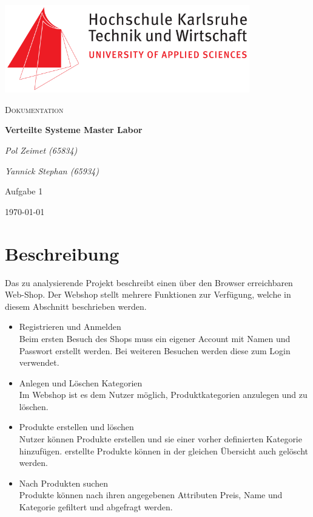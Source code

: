 \documentclass[12pt,a4paper]{article}
\begin{document}
	\begin{titlepage}
		\centering
		\includegraphics[width=0.8\textwidth]{img/Hska_logo.png}\par\vspace{1cm}
		{\scshape\LARGE Dokumentation\par}
		\vspace{1.5cm}
		{\huge\bfseries Verteilte Systeme Master Labor\par}
		\vspace{2cm}
		{\Large\itshape Pol Zeimet (65834)\par}
		{\Large\itshape Yannick Stephan (65934)\par}
		\vfill
		\large Aufgabe 1
		
		\vfill
		
		{\large \today\par}
	\end{titlepage}
	\section{Beschreibung}
	Das zu analysierende Projekt beschreibt einen über den Browser erreichbaren Web-Shop. Der Webshop stellt mehrere Funktionen zur Verfügung, welche in diesem Abschnitt beschrieben werden.
	\begin{itemize}
	\item{Registrieren und Anmelden}\\ Beim ersten Besuch des Shops muss ein eigener Account mit Namen und Passwort erstellt werden. Bei weiteren Besuchen werden diese zum Login verwendet.
	\item{Anlegen und Löschen Kategorien}\\ Im Webshop ist es dem Nutzer möglich, Produktkategorien anzulegen und zu löschen.
	\item{Produkte erstellen und löschen}\\ Nutzer können Produkte erstellen und sie einer vorher definierten Kategorie hinzufügen. erstellte Produkte können in der gleichen Übersicht auch gelöscht werden.
	\item{Nach Produkten suchen}\\ Produkte können nach ihren angegebenen Attributen  Preis, Name und Kategorie gefiltert und abgefragt werden.
	\end{itemize}
\end{document}

